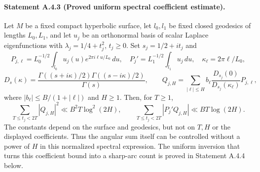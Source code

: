 \paragraph{Statement A.4.3 (Proved uniform spectral coefficient estimate).}
Let $M$ be a fixed compact hyperbolic surface, let $l_0,l_1$ be fixed
closed geodesics of lengths $L_0,L_1$, and let $u_j$ be an orthonormal
basis of scalar Laplace eigenfunctions with
$\lambda_j=1/4+t_j^2$, $t_j\geq0$. Set $s_j=1/2+it_j$ and
\[
 P_{j,\ell}=L_0^{-1/2}\int_{l_0}u_j(u)e^{2\pi i\ell u/L_0}\,du,
 \quad P_j'=L_1^{-1/2}\int_{l_1}u_j\,du,\quad
 \kappa_\ell=2\pi\ell/L_0,
\]
\[
 D_s(\kappa)=
 \frac{\Gamma((s+i\kappa)/2)\Gamma((s-i\kappa)/2)}{\Gamma(s)},
 \qquad
 Q_{j,H}=\sum_{|\ell|\leq H}b_\ell
             \frac{D_{s_j}(0)}{D_{s_j}(\kappa_\ell)}P_{j,\ell},
\]
where $|b_\ell|\leq B/(1+|\ell|)$ and $H\geq1$. Then, for $T\geq1$,
\begin{equation}\label{A:uniform-arc-period}
 \sum_{T\leq t_j<2T}|Q_{j,H}|^2
       \ll B^2T\log^2(2H),\qquad
 \sum_{T\leq t_j<2T}|P_j'Q_{j,H}|
       \ll BT\log(2H).
\end{equation}
The constants depend on the surface and geodesics, but not on $T,H$
or the displayed coefficients. Thus the angular sum itself can be
controlled without a power of $H$ in this normalized spectral expression.
The uniform inversion that turns this coefficient bound into a sharp-arc
count is proved in Statement A.4.4 below.
